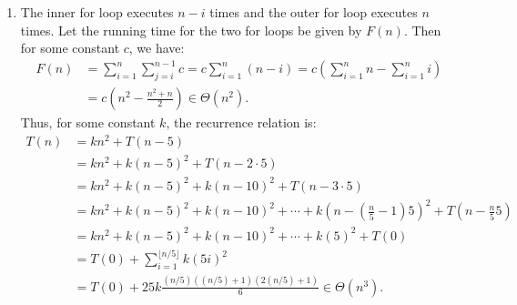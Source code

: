 \documentclass[10pt,oneside,reqno]{amsart}
\theoremstyle{plain}
\theoremstyle{definition}
\begin{document}
\begin{enumerate}[label=\arabic*.]
\item The inner for loop executes $n - i$ times and the outer for loop executes $n$ times. Let the running time for the two for loops be given by $F(n)$. Then for some constant $c$, we have:
\begin{equation}
\begin{aligned}
F(n) &= \sum_{i = 1}^n \sum_{j = i}^{n  -1} c = c\sum_{i = 1}^n (n - i) = c\left(\sum_{i = 1}^nn - \sum_{i = 1}^ni \right)\\
&= c\left(n^2 - \frac{n^2 + n}{2} \right) \in \Theta(n^2).  
\end{aligned}
\end{equation}
Thus, for some constant $k$, the recurrence relation is: 
\begin{equation}
\begin{aligned}
T(n) &= kn^2 + T(n - 5) \\
&= kn^2 + k(n - 5)^2 + T(n - 2\cdot 5) \\
&= kn^2 + k(n - 5)^2 + k(n - 10)^2 + T(n - 3 \cdot 5)\\
&= kn^2 + k(n - 5)^2 + k(n - 10)^2 + \cdots +k(n - (\frac{n}{5} - 1)5)^2 +  T(n - \frac{n}{5}5)\\
&= kn^2 + k(n - 5)^2 + k(n - 10)^2 + \cdots +k(5)^2 +  T(0)\\
&= T(0) + \sum_{i = 1}^{\lfloor n/5 \rfloor} k(5i)^2\\
&= T(0) + 25k \frac{(n/5)((n/5) + 1)(2(n/5) + 1)}{6} \in \Theta(n^3). 
\end{aligned}
\end{equation}







 







\end{enumerate}
\end{document}

